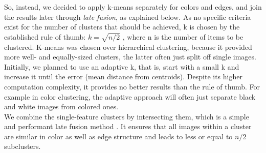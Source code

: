 So, instead, we decided to apply k-means separately for colors and edges, and join the results later through \emph{late fusion}, as explained below. As no specific criteria exist for the number of clusters that should be achieved, k is chosen by the established rule of thumb: $ k = \sqrt{n/2} $ \cite[p.365]{mardia1979}, where n is the number of items to be clustered. K-means was chosen over hierarchical clustering, because it provided more well- and equally-sized clusters, the latter often just split off single images.\\
Initially, we planned to use an adaptive k, that is, start with a small k and increase it until the error (mean distance from centroids). Despite its higher computation complexity, it provides no better results than the rule of thumb. For example in color clustering, the adaptive approach will often just separate black and white images from colored ones.\\
We combine the single-feature clusters by intersecting them, which is a simple and performant late fusion method . It ensures that all images within a cluster are similar in color as well as edge structure and leads to less or equal to $ n/2 $ subclusters.
